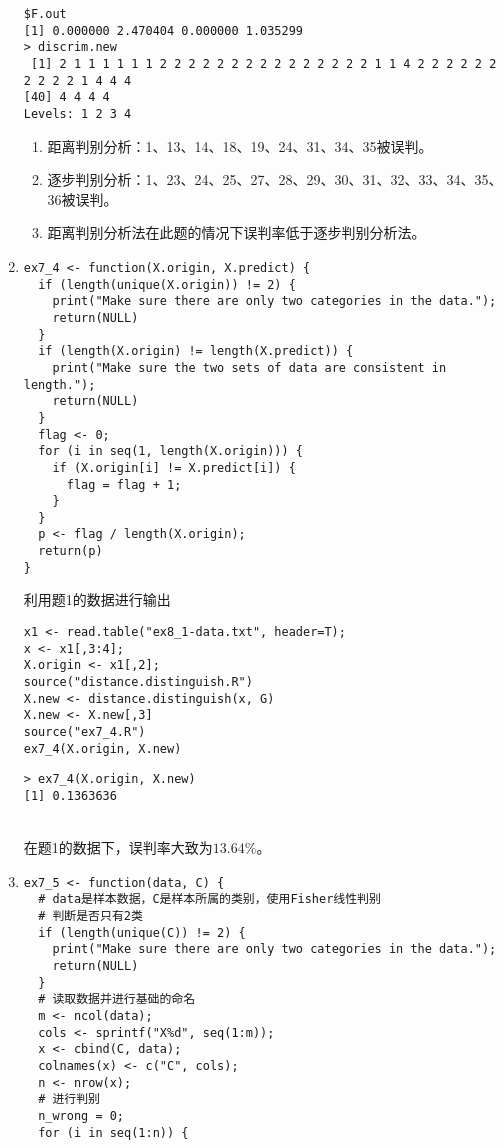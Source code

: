 \begin{enumerate}
\begin{lstlisting}
$F.out
[1] 0.000000 2.470404 0.000000 1.035299
> discrim.new
 [1] 2 1 1 1 1 1 1 2 2 2 2 2 2 2 2 2 2 2 2 2 2 2 1 1 4 2 2 2 2 2 2 2 2 2 2 1 4 4 4
[40] 4 4 4 4
Levels: 1 2 3 4
\end{lstlisting}
        \summary
        \begin{enumerate}[label=(\arabic*)]
            \item 距离判别分析：1、13、14、18、19、24、31、34、35被误判。
            \item 逐步判别分析：1、23、24、25、27、28、29、30、31、32、33、34、35、36被误判。
            \item 距离判别分析法在此题的情况下误判率低于逐步判别分析法。
        \end{enumerate}
        \item
        \code
\begin{lstlisting}
ex7_4 <- function(X.origin, X.predict) {
  if (length(unique(X.origin)) != 2) {
    print("Make sure there are only two categories in the data.");
    return(NULL)
  }
  if (length(X.origin) != length(X.predict)) {
    print("Make sure the two sets of data are consistent in length.");
    return(NULL)
  }
  flag <- 0;
  for (i in seq(1, length(X.origin))) {
    if (X.origin[i] != X.predict[i]) {
      flag = flag + 1;
    }
  }
  p <- flag / length(X.origin);
  return(p)
}
\end{lstlisting}
利用题1的数据进行输出
\begin{lstlisting}
x1 <- read.table("ex8_1-data.txt", header=T);
x <- x1[,3:4];
X.origin <- x1[,2];
source("distance.distinguish.R")
X.new <- distance.distinguish(x, G)
X.new <- X.new[,3]
source("ex7_4.R")
ex7_4(X.origin, X.new)
\end{lstlisting}
        \out
\begin{lstlisting}
> ex7_4(X.origin, X.new)
[1] 0.1363636
\end{lstlisting}
        \summary\\
        在题1的数据下，误判率大致为$13.64\%$。
        \item
        \code
\begin{lstlisting}
ex7_5 <- function(data, C) {
  # data是样本数据，C是样本所属的类别，使用Fisher线性判别
  # 判断是否只有2类
  if (length(unique(C)) != 2) {
    print("Make sure there are only two categories in the data.");
    return(NULL)
  }
  # 读取数据并进行基础的命名
  m <- ncol(data);
  cols <- sprintf("X%d", seq(1:m));
  x <- cbind(C, data);
  colnames(x) <- c("C", cols);
  n <- nrow(x);
  # 进行判别
  n_wrong = 0;
  for (i in seq(1:n)) {

\end{lstlisting}
\end{enumerate}
